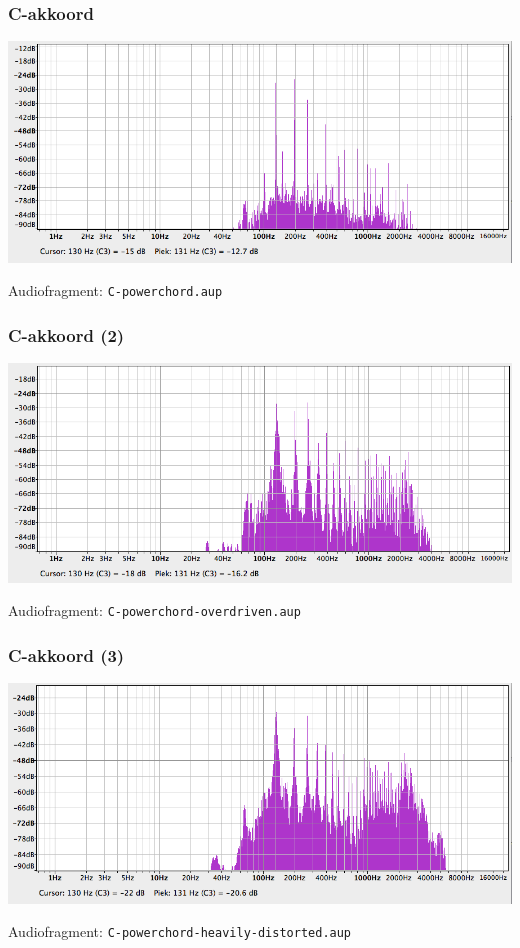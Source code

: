 \documentclass[compress, darktitle, framenumber]{beamer}
\begin{document}
\begin{frame}
\frametitle{C-akkoord}
\includegraphics[width=\textwidth]{images/C-powerchord.png}
\begin{block}{Audiofragment:}
\texttt{C-powerchord.aup}
\end{block}
\end{frame}

\begin{frame}
\frametitle{C-akkoord (2)}
\includegraphics[width=\textwidth]{images/C-powerchord-overdriven.png}
\begin{block}{Audiofragment:}
\texttt{C-powerchord-overdriven.aup}
\end{block}
\end{frame}

\begin{frame}
\frametitle{C-akkoord (3)}
\includegraphics[width=\textwidth]{images/C-powerchord-heavily-distorted.png}
\begin{block}{Audiofragment:}
\texttt{C-powerchord-heavily-distorted.aup} 
\end{block}
\end{frame}
\end{document}
